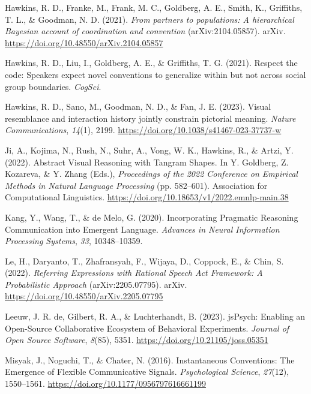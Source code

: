 \documentclass[10pt, letterpaper]{article}
\begin{document}
\begin{CSLReferences}{1}{0}
Hawkins, R. D., Franke, M., Frank, M. C., Goldberg, A. E., Smith, K.,
Griffiths, T. L., \& Goodman, N. D. (2021). \emph{From partners to
populations: {A} hierarchical {Bayesian} account of coordination and
convention} (arXiv:2104.05857). arXiv.
\url{https://doi.org/10.48550/arXiv.2104.05857}

Hawkins, R. D., Liu, I., Goldberg, A. E., \& Griffiths, T. G. (2021).
Respect the code: {Speakers} expect novel conventions to generalize
within but not across social group boundaries. \emph{CogSci}.

Hawkins, R. D., Sano, M., Goodman, N. D., \& Fan, J. E. (2023). Visual
resemblance and interaction history jointly constrain pictorial meaning.
\emph{Nature Communications}, \emph{14}(1), 2199.
\url{https://doi.org/10.1038/s41467-023-37737-w}

Ji, A., Kojima, N., Rush, N., Suhr, A., Vong, W. K., Hawkins, R., \&
Artzi, Y. (2022). Abstract {Visual Reasoning} with {Tangram Shapes}. In
Y. Goldberg, Z. Kozareva, \& Y. Zhang (Eds.), \emph{Proceedings of the
2022 {Conference} on {Empirical Methods} in {Natural Language
Processing}} (pp. 582--601). Association for Computational Linguistics.
\url{https://doi.org/10.18653/v1/2022.emnlp-main.38}

Kang, Y., Wang, T., \& de Melo, G. (2020). Incorporating {Pragmatic
Reasoning Communication} into {Emergent Language}. \emph{Advances in
{Neural Information Processing Systems}}, \emph{33}, 10348--10359.

Le, H., Daryanto, T., Zhafransyah, F., Wijaya, D., Coppock, E., \& Chin,
S. (2022). \emph{Referring {Expressions} with {Rational Speech Act
Framework}: {A Probabilistic Approach}} (arXiv:2205.07795). arXiv.
\url{https://doi.org/10.48550/arXiv.2205.07795}

Leeuw, J. R. de, Gilbert, R. A., \& Luchterhandt, B. (2023). {jsPsych}:
{Enabling} an {Open-Source Collaborative Ecosystem} of {Behavioral
Experiments}. \emph{Journal of Open Source Software}, \emph{8}(85),
5351. \url{https://doi.org/10.21105/joss.05351}

Misyak, J., Noguchi, T., \& Chater, N. (2016). Instantaneous
{Conventions}: {The Emergence} of {Flexible Communicative Signals}.
\emph{Psychological Science}, \emph{27}(12), 1550--1561.
\url{https://doi.org/10.1177/0956797616661199}


\end{CSLReferences}
\end{document}
